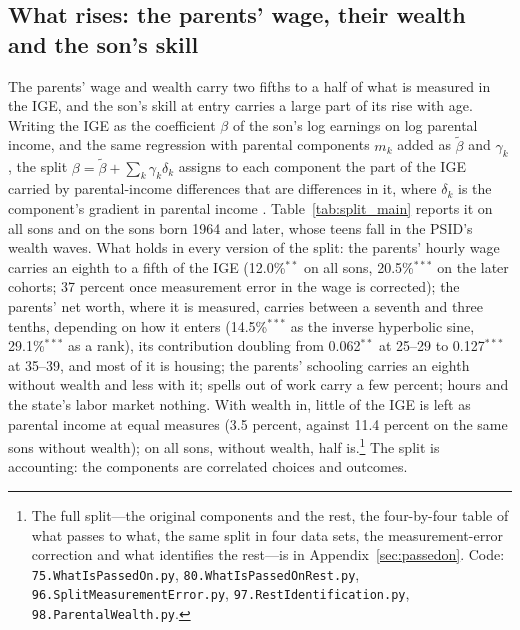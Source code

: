 \subsection{What rises: the parents' wage, their wealth and the son's skill}

The parents' wage and wealth carry two fifths to a half of what is measured in the IGE, and the son's skill at entry
carries a large part of its rise with age. Writing the IGE as the coefficient $\beta$ of the son's log earnings on log parental income, and the
same regression with parental components $m_k$ added as $\tilde\beta$ and $\gamma_k$, the split
$\beta = \tilde\beta + \sum_k \gamma_k \delta_k$ assigns to each component the part of the IGE carried by
parental-income differences that are differences in it, where $\delta_k$ is the component's gradient in parental income
\citep{gelbach2016covariates}. Table~\ref{tab:split_main} reports it on all sons and on the sons born 1964 and later,
whose teens fall in the PSID's wealth waves. What holds in every version of the split: the parents' hourly wage carries
an eighth to a fifth of the IGE (12.0\%$^{**}$ on all sons, 20.5\%$^{***}$ on the later cohorts; 37 percent once measurement error in the wage is
corrected); the parents' net worth, where it is measured, carries between a seventh and three tenths, depending on how
it enters (14.5\%$^{***}$ as the inverse hyperbolic sine, 29.1\%$^{***}$ as a rank), its contribution doubling from
0.062$^{**}$ at 25--29 to 0.127$^{***}$ at 35--39, and most of it is housing; the parents' schooling carries an eighth without wealth
and less with it; spells out of work carry a few percent; hours and the state's labor market nothing. With wealth in,
little of the IGE is left as parental income at equal measures (3.5 percent, against 11.4 percent on the same sons
without wealth); on all sons, without wealth, half is.\footnote{The full split---the original components and the rest, the four-by-four table of what passes to what, the
same split in four data sets, the measurement-error correction and what identifies the rest---is in
Appendix~\ref{sec:passedon}. Code: \texttt{75.WhatIsPassedOn.py}, \texttt{80.WhatIsPassedOnRest.py},
\texttt{96.SplitMeasurementError.py}, \texttt{97.RestIdentification.py}, \texttt{98.ParentalWealth.py}.} The split is
accounting: the components are correlated choices and outcomes.



